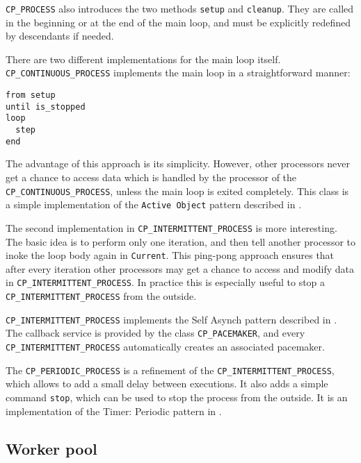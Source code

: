 \documentclass[a4paper,10pt]{article}
\begin{document}
\lstinline!CP_PROCESS! also introduces the two methods \lstinline!setup! and \lstinline!cleanup!.
They are called in the beginning or at the end of the main loop, and must be explicitly redefined by descendants if needed.

There are two different implementations for the main loop itself.
\lstinline!CP_CONTINUOUS_PROCESS! implements the main loop in a straightforward manner:
\begin{lstlisting}
from setup
until is_stopped
loop
  step
end
\end{lstlisting}
The advantage of this approach is its simplicity.
However, other processors never get a chance to access data which is handled by the processor of the \lstinline!CP_CONTINUOUS_PROCESS!, unless the main loop is exited completely.
This class is a simple implementation of the \lstinline!Active Object! pattern described in .

The second implementation in \lstinline!CP_INTERMITTENT_PROCESS! is more interesting.
The basic idea is to perform only one iteration, and then tell another processor to inoke the loop body again in \lstinline!Current!.
This ping-pong approach ensures that after every iteration other processors may get a chance to access and modify data in \lstinline!CP_INTERMITTENT_PROCESS!.
In practice this is especially useful to stop a \lstinline!CP_INTERMITTENT_PROCESS! from the outside.

\lstinline!CP_INTERMITTENT_PROCESS! implements the Self Asynch pattern described in .
The callback service is provided by the class \lstinline!CP_PACEMAKER!, and every \lstinline!CP_INTERMITTENT_PROCESS! automatically creates an associated pacemaker.

The \lstinline!CP_PERIODIC_PROCESS! is a refinement of the \lstinline!CP_INTERMITTENT_PROCESS!, which allows to add a small delay between executions.
It also adds a simple command \lstinline!stop!, which can be used to stop the process from the outside.
It is an implementation of the Timer: Periodic pattern in .

\subsection{Worker pool}
\label{sec:worker_pool} 
\end{document}
